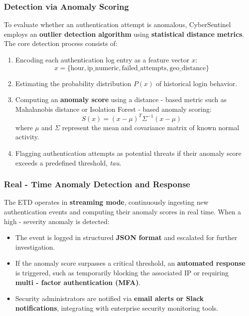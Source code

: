 \documentclass{article}
\begin{document}
\subsubsection{Detection via Anomaly Scoring}
To evaluate whether an authentication attempt is anomalous, CyberSentinel employs an \textbf{outlier detection algorithm} using \textbf{statistical distance metrics}. The core detection process consists of:
\begin{enumerate}
    \item Encoding each authentication log entry as a feature vector \( x \):
    \begin{equation}
    x = \{ \text{hour}, \text{ip\_numeric}, \text{failed\_attempts}, \text{geo\_distance} \}
    \end{equation}

    \item Estimating the probability distribution \( P(x) \) of historical login behavior.
    \item Computing an \textbf{anomaly score} using a distance - based metric such as Mahalanobis distance or Isolation Forest - based anomaly scoring:
    \begin{equation}
    S(x) = (x  -  \mu)^T \Sigma^{ - 1} (x  -  \mu)
    \end{equation}
    where \( \mu \) and \( \Sigma \) represent the mean and covariance matrix of known normal activity.
    \item Flagging authentication attempts as potential threats if their anomaly score exceeds a predefined threshold, \textit{tau}.
\end{enumerate}

\subsubsection{Real - Time Anomaly Detection and Response}
The ETD operates in \textbf{streaming mode}, continuously ingesting new authentication events and computing their anomaly scores in real time. When a high - severity anomaly is detected:
\begin{itemize}
    \item The event is logged in structured \textbf{JSON format} and escalated for further investigation.
    \item If the anomaly score surpasses a critical threshold, an \textbf{automated response} is triggered, such as temporarily blocking the associated IP or requiring \textbf{multi - factor authentication (MFA)}.
    \item Security administrators are notified via \textbf{email alerts or Slack notifications}, integrating with enterprise security monitoring tools.
\end{itemize}
\end{document}
